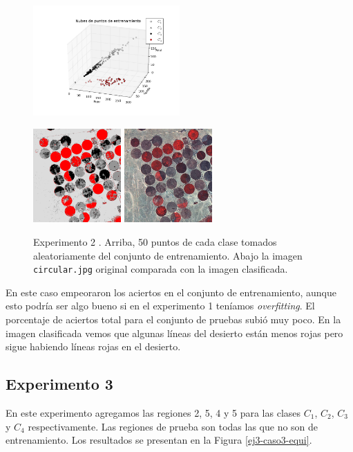 \documentclass[a4paper,11pt]{article}
\begin{document}
\begin{figure}[h!]
\centering
\includegraphics[width=0.5\textwidth]{img/ej3-caso2-equi-puntos.png}

\includegraphics[width=0.3\textwidth]{img/ej3-caso2-equi-clasif.png}
\includegraphics[width=0.3\textwidth]{img/circular.jpg}
\caption{Experimento 2%
. Arriba, 50 puntos de cada clase tomados aleatoriamente del conjunto de entrenamiento. Abajo la imagen {\tt circular.jpg} original comparada con la imagen clasificada.}
\label{ej3-caso2-equi}
\end{figure}

En este caso empeoraron los aciertos en el conjunto de entrenamiento, aunque esto podría ser algo bueno si en el experimento 1 teníamos \emph{overfitting}. El porcentaje de aciertos total para el conjunto de pruebas subió muy poco. En la imagen clasificada vemos que algunas líneas del desierto están menos rojas pero sigue habiendo líneas rojas en el desierto.


\newpage
\subsection{Experimento 3}
En este experimento agregamos las regiones 2, 5, 4 y 5 para las clases $C_1$, $C_2$, $C_3$ y $C_4$ respectivamente.
Las regiones de prueba son todas las que no son de entrenamiento. Los resultados se presentan en la Figura \ref{ej3-caso3-equi}. %
\end{document}
